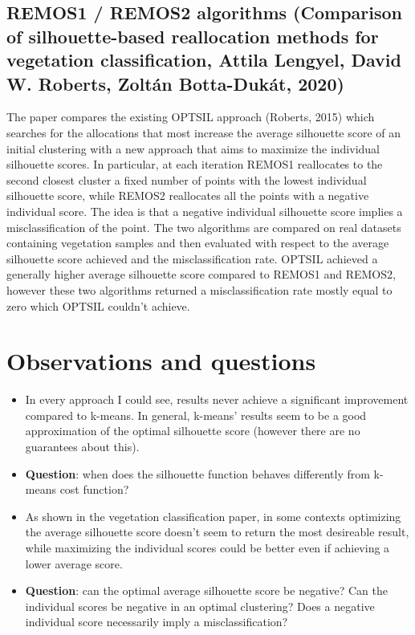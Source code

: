 \documentclass{article}
\begin{document}
\subsection{\textbf{REMOS1 / REMOS2} algorithms (Comparison of silhouette-based reallocation methods for vegetation classification, Attila Lengyel, David W. Roberts, Zoltán Botta-Dukát, 2020)}

The paper compares the existing OPTSIL approach (Roberts, 2015) which searches for the allocations that most increase the average silhouette score of an initial clustering with a new approach that aims to maximize the individual silhouette scores. In particular, at each iteration REMOS1 reallocates to the second closest cluster a fixed number of points with the lowest individual silhouette score, while REMOS2 reallocates all the points with a negative individual score.
The idea is that a negative individual silhouette score implies a misclassification of the point.
The two algorithms are compared on real datasets containing vegetation samples and then evaluated with respect to the average silhouette score achieved and the misclassification rate.
OPTSIL achieved a generally higher average silhouette score compared to REMOS1 and REMOS2, however these two algorithms returned a misclassification rate mostly equal to zero which OPTSIL couldn’t achieve. 

\section*{Observations and questions}

\begin{itemize}
\item In every approach I could see, results never achieve a significant improvement compared to k-means. In general, k-means’ results seem to be a good approximation of the optimal silhouette score (however there are no guarantees about this).
\item \textbf{Question}: when does the silhouette function behaves differently from k-means cost function?
\item As shown in the vegetation classification paper, in some contexts optimizing the average silhouette score doesn’t seem to return the most desireable result, while maximizing the individual scores could be better even if achieving a lower average score.
\item \textbf{Question}: can the optimal average silhouette score be negative? Can the individual scores be negative in an optimal clustering? Does a negative individual score necessarily imply a misclassification? 
\end{itemize}
\end{document}
